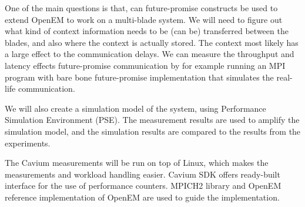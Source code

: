 One of the main questions is that, can future-promise constructs be used to extend OpenEM to work on a multi-blade system. We will need to figure out what kind of context information needs to be (can be) transferred between the blades, and also where the context is actually stored. The context most likely has a large effect to the communication delays. We can measure the throughput and latency  effects future-promise communication by for example running an MPI program with bare bone future-promise implementation that simulates the real-life communication.

We will also create a simulation model of the system, using Performance Simulation Environment (PSE). The measurement results are used to amplify the simulation model, and the simulation results are compared to the results from the experiments.

The Cavium measurements will be run on top of Linux, which makes the measurements and workload handling easier. Cavium SDK offers ready-built interface for the use of performance counters. MPICH2 library and OpenEM reference implementation of OpenEM are used to guide the implementation.

